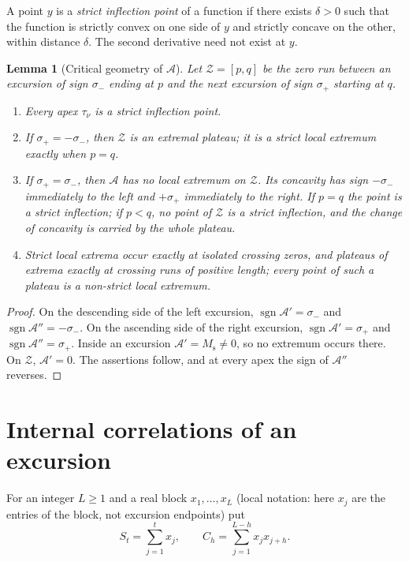 \documentclass[11pt,reqno]{amsart}
\numberwithin{equation}{section}
\theoremstyle{plain}
\newtheorem{lemma}[theorem]{Lemma}
\theoremstyle{definition}
\theoremstyle{remark}
\DeclareMathOperator{\sgn}{sgn}
\newcommand{\Ms}{M_{\mathrm{s}}}
\newcommand{\Anet}{\mathcal{A}}
\begin{document}
A point $y$ is a \emph{strict inflection point} of a function if there
exists $\delta>0$ such that the function is strictly convex on one side of
$y$ and strictly concave on the other, within distance $\delta$. The second
derivative need not exist at $y$.

\begin{lemma}[Critical geometry of $\Anet$]
\label{lem:critical}
Let $\mathcal Z=[p,q]$ be the zero run between an excursion of sign $\sigma_-$ ending
at $p$ and the next excursion of sign $\sigma_+$ starting at $q$.
\begin{enumerate}[label=\textup{(\roman*)}]
\item Every apex $\tau_\nu$ is a strict inflection point.
\item If $\sigma_+=-\sigma_-$, then $\mathcal Z$ is an extremal plateau; it is a
strict local extremum exactly when $p=q$.
\item If $\sigma_+=\sigma_-$, then $\Anet$ has no local extremum on
$\mathcal Z$. Its concavity has sign $-\sigma_-$ immediately to the left
and $+\sigma_+$ immediately to the right. If $p=q$ the point is a strict inflection; if
$p<q$, no point of $\mathcal Z$ is a strict inflection, and the change of concavity
is carried by the whole plateau.
\item Strict local extrema occur exactly at isolated crossing zeros, and
plateaus of extrema exactly at crossing runs of positive length; every point
of such a plateau is a non-strict local extremum.
\end{enumerate}
\end{lemma}

\begin{proof}
On the descending side of the left excursion,
$\sgn\Anet'=\sigma_-$ and $\sgn\Anet''=-\sigma_-$. On the ascending side of
the right excursion, $\sgn\Anet'=\sigma_+$ and $\sgn\Anet''=\sigma_+$. Inside an excursion
$\Anet'=\Ms\ne0$, so no extremum occurs there. On
$\mathcal Z$, $\Anet'=0$. The assertions follow, and at every apex the sign of
$\Anet''$ reverses.
\end{proof}


\section{Internal correlations of an excursion}
\label{sec:internal_corr}

For an integer $L\ge1$ and a real block $x_1,\dots,x_L$ (local notation:
here $x_j$ are the entries of the block, not excursion endpoints) put
\begin{equation}
\label{eq:block_def}
S_t=\sum_{j=1}^t x_j,\qquad
C_h=\sum_{j=1}^{L-h}x_jx_{j+h}.
\end{equation}
\end{document}
